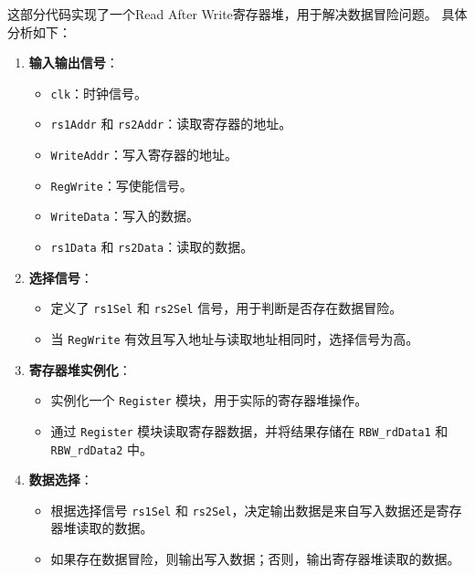 \documentclass[12pt,hyperref,a4paper,UTF8]{ctexart}
\begin{document}
\newpage

这部分代码实现了一个Read After Write寄存器堆，用于解决数据冒险问题。
具体分析如下：
\begin{enumerate}
    \item \textbf{输入输出信号}：
    \begin{itemize}
        \item \texttt{clk}：时钟信号。
        \item \texttt{rs1Addr} 和 \texttt{rs2Addr}：读取寄存器的地址。
        \item \texttt{WriteAddr}：写入寄存器的地址。
        \item \texttt{RegWrite}：写使能信号。
        \item \texttt{WriteData}：写入的数据。
        \item \texttt{rs1Data} 和 \texttt{rs2Data}：读取的数据。
    \end{itemize}

    \item \textbf{选择信号}：
    \begin{itemize}
        \item 定义了 \texttt{rs1Sel} 和 \texttt{rs2Sel} 信号，用于判断是否存在数据冒险。
        \item 当 \texttt{RegWrite} 有效且写入地址与读取地址相同时，选择信号为高。
    \end{itemize}

    \item \textbf{寄存器堆实例化}：
    \begin{itemize}
        \item 实例化一个 \texttt{Register} 模块，用于实际的寄存器堆操作。
        \item 通过 \texttt{Register} 模块读取寄存器数据，并将结果存储在 \texttt{RBW\_rdData1} 和 \texttt{RBW\_rdData2} 中。
    \end{itemize}

    \item \textbf{数据选择}：
    \begin{itemize}
        \item 根据选择信号 \texttt{rs1Sel} 和 \texttt{rs2Sel}，决定输出数据是来自写入数据还是寄存器堆读取的数据。
        \item 如果存在数据冒险，则输出写入数据；否则，输出寄存器堆读取的数据。
    \end{itemize}
\end{enumerate}
\end{document}
